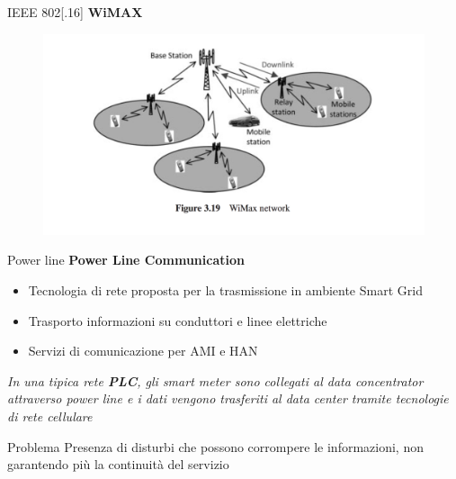 \begin{frame}{IEEE 802[.16]}
	\textbf{WiMAX}
	\begin{figure}[h]
		\includegraphics[scale=0.3,cfbox=blue_slides 1pt 0pt]{imgs/wim.png}
	\end{figure}
\end{frame}

\begin{frame}{Power line}
	\textbf{Power Line Communication}
	\begin{itemize}[<+- | alert@+>]
		\item Tecnologia di rete proposta per la trasmissione in ambiente Smart Grid
		\item Trasporto informazioni su conduttori e linee elettriche %
		\item Servizi di comunicazione per AMI e HAN
	\end{itemize}
	\pause
	\begin{block}{}
		\textit{In una tipica rete \textbf{\color{blue_slides}PLC}, gli smart meter sono collegati al data concentrator attraverso power line e i dati vengono trasferiti al data center tramite tecnologie di rete cellulare}
	\end{block}
	\pause
	\begin{block}{Problema}
		Presenza di disturbi che possono corrompere le informazioni, non garantendo più la continuità del servizio
	\end{block}
\end{frame}


